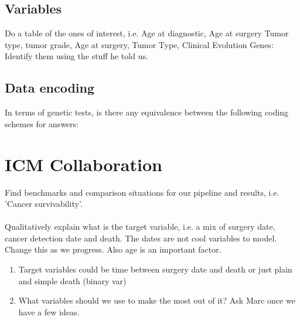 \documentclass[a4paper]{article}
\begin{document}
\subsection{Variables}
Do a table of the ones of interest, i.e. Age at diagnostic, Age at surgery Tumor type, tumor grade, Age at surgery, Tumor Type, Clinical Evolution
Genes: Identify them using the stuff he told us. 

\subsection{Data encoding} 
In terms of genetic tests, is there any equivalence between the following coding schemes for answers:

\section{ICM Collaboration}
Find benchmarks and comparison situations for our pipeline and results, i.e. 'Cancer survivability'. \\
\\
Qualitatively explain what is the target variable, i.e. a mix of surgery date, cancer detection date and death. The dates are not cool variables to model. Change this as we progress. Also age is an important factor. \\ 
\begin{enumerate}
\item Target variables could be time between surgery date and death or just plain and simple death (binary var)
\item What variables should we use to make the most out of it? Ask Marc once we have a few ideas. 
\end{enumerate}
\end{document}
